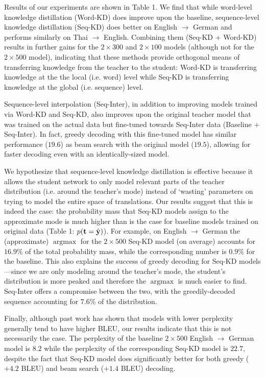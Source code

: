 \documentclass[11pt,letterpaper]{article}
\DeclareMathOperator*{\argmax}{argmax}
\begin{document}
Results of our experiments are shown in Table 1. We find that while
word-level knowledge distillation (Word-KD) does improve upon the
baseline, sequence-level knowledge distillation (Seq-KD) does better
on English $\rightarrow$ German and performs similarly on Thai
$\rightarrow$ English. Combining them (Seq-KD $+$ Word-KD) results in further gains
for the $2\times 300$ and $2\times100$ models (although not for the $2\times500$ model),
indicating that these methods provide orthogonal means of transferring knowledge
from the teacher to the student: Word-KD is transferring knowledge at the
 the local (i.e. word) level while Seq-KD is transferring knowledge
at the global (i.e. sequence) level.

Sequence-level interpolation (Seq-Inter), in addition to improving models trained via
Word-KD and Seq-KD, 
also improves upon the original teacher model that was trained on the actual data
but fine-tuned towards Seq-Inter data (Baseline $+$ Seq-Inter). 
In fact, greedy decoding with this fine-tuned model has similar
performance ($19.6$) as beam search with the original model ($19.5$), allowing for faster
decoding even with an identically-sized model. 

We hypothesize that sequence-level knowledge distillation is effective because it allows the student network to only model
relevant parts of the teacher distribution (i.e. around the teacher's mode) instead of `wasting' parameters on trying to
model the entire space of translations.
Our results suggest that this is indeed the case: the probability mass that Seq-KD models assign to the approximate mode 
is much higher than is the case for baseline models trained on original data (Table 1: $p(\mathbf{t} = \hat{\mathbf{y}})$). 
For example, on English $\rightarrow$ German the (approximate) $\argmax$ for the $2 \times 500$ Seq-KD model 
(on average) accounts for $16.9\%$ of the total probability mass, while the corresponding number is $0.9\%$ for the baseline. 
This also explains the success of 
greedy decoding for Seq-KD models---since we are only modeling around the teacher's mode, the student's distribution
is more peaked and therefore the $\argmax$ is much easier to find. Seq-Inter offers a compromise between the two, with
the greedily-decoded sequence accounting for $7.6\%$ of the distribution.

Finally, although past work has shown that models with lower perplexity generally tend to have higher BLEU,
our results indicate that this is not necessarily the case. The perplexity of the baseline $2\times500$  English $\rightarrow$ German 
 model is $8.2$ while the perplexity of the 
corresponding Seq-KD model is $22.7$, despite the fact that Seq-KD model does significantly better for both greedy ($+4.2$ BLEU)
and beam search ($+1.4$ BLEU) decoding. 
\end{document}
